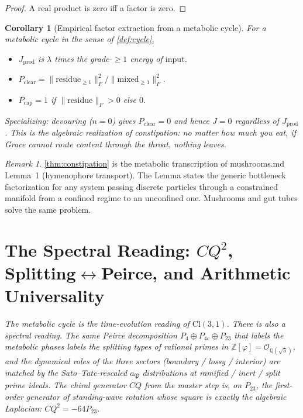 \documentclass[11pt,a4paper]{article}
\theoremstyle{plain}
\newtheorem{corollary}[theorem]{Corollary}
\theoremstyle{definition}
\theoremstyle{remark}
\newtheorem{remark}[theorem]{Remark}
\numberwithin{equation}{section}
\providecommand{\Cl}{\mathrm{Cl}}
\providecommand{\Z}{\mathbb{Z}}
\providecommand{\Q}{\mathbb{Q}}
\providecommand{\vp}{\varphi}
\providecommand{\cO}{\mathcal{O}}
\newenvironment{sectionopener}
  {\begin{sectionopenerframe}\small\itshape\ignorespaces}
  {\end{sectionopenerframe}}
\begin{document}
\begin{proof}
A real product is zero iff a factor is zero.
\end{proof}

\begin{corollary}[Empirical factor extraction from a metabolic cycle]
\label{cor:cycle-flux}
For a metabolic cycle in the sense of \cref{def:cycle},
\begin{itemize}
\item $J_\mathrm{prod}$ is $\lambda$ times the grade-$\geq 1$ energy of $\mathrm{input}$.
\item $P_\mathrm{clear} = \|\mathrm{residue}_{\geq 1}\|_F^2 / \|\mathrm{mixed}_{\geq 1}\|_F^2$.
\item $P_\mathrm{cap} = 1$ if $\|\mathrm{residue}\|_F > 0$ else $0$.
\end{itemize}
Specializing: devouring ($n = 0$) gives $P_\mathrm{clear} = 0$ and
hence $J = 0$ regardless of $J_\mathrm{prod}$. This is the algebraic
realization of constipation: no matter how much you eat, if Grace
cannot route content through the throat, nothing leaves.
\end{corollary}

\begin{remark}
\cref{thm:constipation} is the metabolic transcription of
mushrooms.md Lemma~1 (hymenophore transport). The Lemma states the
generic bottleneck factorization for any system passing discrete
particles through a constrained manifold from a confined regime to
an unconfined one. Mushrooms and gut tubes solve the same problem.
\end{remark}

\section{The Spectral Reading: $CQ^2$, Splitting$\leftrightarrow$Peirce, and Arithmetic Universality}
\label{sec:spectral}

\begin{sectionopener}
The metabolic cycle is the time-evolution reading of $\Cl(3,1)$.
There is also a spectral reading. The same Peirce decomposition
$P_4 \oplus P_{4c} \oplus P_{23}$ that labels the metabolic phases
labels the splitting types of rational primes in
$\Z[\vp] = \cO_{\Q(\sqrt 5)}$, and the dynamical roles of the three
sectors (boundary / lossy / interior) are matched by the
Sato--Tate-rescaled $a_\mathfrak{P}$ distributions at
ramified / inert / split prime ideals. The chiral generator
$CQ$ from the master step is, on $P_{23}$, the first-order
generator of standing-wave rotation whose square is exactly the
algebraic Laplacian: $CQ^2 = -64 P_{23}$.
\end{sectionopener}
\end{document}
